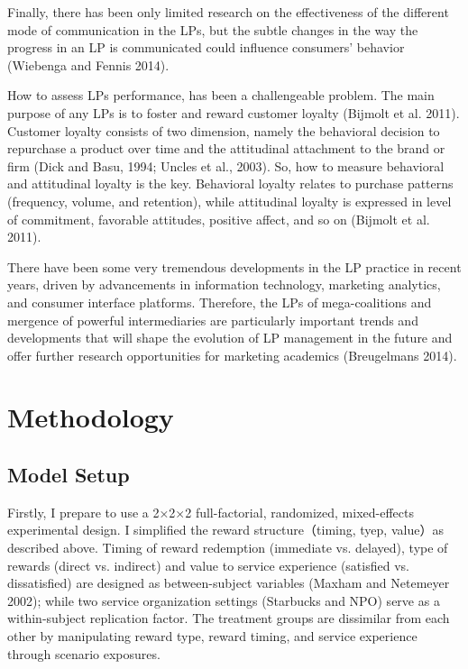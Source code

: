 \documentclass[12pt]{article}
\begin{document}
\begin{spacing}{1.5}
Finally, there has been only limited research on the effectiveness of the different mode of communication in the LPs, but the subtle changes in the way the progress in an LP is communicated could influence consumers' behavior (Wiebenga and Fennis 2014)\cite{wiebenga2014road}.   


How to assess LPs performance, has been a challengeable problem. The main purpose of any LPs is to foster and reward customer loyalty (Bijmolt et al. 2011)\cite{bijmolt2011loyalty}. Customer loyalty consists of two dimension, namely the behavioral decision to repurchase a product over time and the attitudinal attachment to the brand or firm (Dick and Basu, 1994; Uncles et al., 2003)\cite{dick1994customer}\cite{uncles2003customer}. So, how to measure behavioral and attitudinal loyalty is the key. Behavioral loyalty relates to purchase patterns (frequency, volume, and retention), while attitudinal loyalty is expressed in level of commitment, favorable attitudes, positive affect, and so on (Bijmolt et al. 2011)\cite{bijmolt2011loyalty}.

There have been some very tremendous developments in the LP practice in recent years, driven by advancements in information technology, marketing analytics, and consumer interface platforms. Therefore, the LPs of mega-coalitions and mergence of powerful intermediaries are particularly important trends and developments that will shape the evolution of LP management in the future and offer further research opportunities for marketing academics (Breugelmans 2014)\cite{breugelmans2015advancing}. 


\section{Methodology}
\subsection{Model Setup}
Firstly, I prepare to use a 2×2×2 full-factorial, randomized, mixed-effects experimental design. I simplified the reward structure（timing, tyep, value）as described above. Timing of reward redemption (immediate vs. delayed), type of rewards (direct vs. indirect) and value to service experience (satisfied vs. dissatisfied) are designed as between-subject variables (Maxham and Netemeyer 2002)\cite{maxham2002longitudinal}; while two service organization settings (Starbucks and NPO) serve as a within-subject replication factor. The treatment groups are dissimilar from each other by manipulating reward type, reward timing, and service experience through scenario exposures.




\end{spacing}
\end{document}
